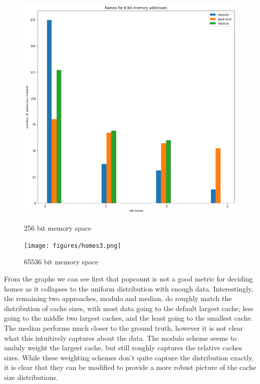 \begin{figure}[h]
  \centering
  \begin{minipage}[b]{0.4\textwidth}
    \includegraphics[width=\textwidth]{figures/homes.png}
    \caption{256 bit memory space}
    \label{Fig:homes}
  \end{minipage}
  \hfill
  \begin{minipage}[b]{0.4\textwidth}
    \texttt{[image: figures/homes3.png]}
    \caption{65536 bit memory space }
    \label{Fig:homes2}
  \end{minipage}
\end{figure}

From the graphs we can see first that popcount is not a good metric for deciding
homes as it collapses to the uniform distribution with enough data.
Interestingly, the remaining two approaches, modulo and median, do roughly match
the distribution of cache sizes, with most data going to the default largest
cache, less going to the middle two largest caches, and the least going to the
smallest cache.  The median performs much closer to the ground truth, however it
is not clear what this intuitively captures about the data.  The modulo scheme
seems to unduly weight the largest cache, but still roughly captures the
relative caches sizes.  While these weighting schemes don't quite capture the
distribution exactly, it is clear that they can be modified to provide a more
robust picture of the cache size distributions.

